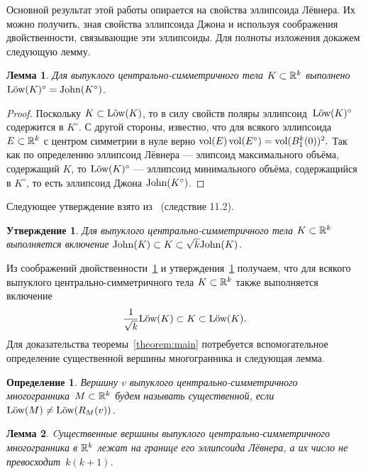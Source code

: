 \documentclass[a4paper,12pt]{article}
\def\vol{\mathop{\rm vol}}
\def\low{\text{\rm L\"ow}}
\def\john{\mathbf{\rm John}}
\newcommand{\lb}[1]{#1\nobreak\discretionary{}{\hbox{\ensuremath{#1}}}{}}
\newtheorem{lem}{Лемма}[section]
\newtheorem{prop}{Утверждение}[section]
\newtheorem*{defin*}{Определение}
\numberwithin{equation}{section}
\begin{document}
	Основной результат этой работы опирается на свойства эллипсоида Лёвнера. Их можно получить, зная свойства эллипсоида Джона и используя соображения двойственности, связывающие эти эллипсоиды. Для полноты изложения докажем следующую лемму.
	\begin{lem}\label{lem:duality}
		Для выпуклого центрально-симметричного тела $K\subset\mathbb {R}^k$ выполнено $\low(K)^{\circ}\lb=\john(K^{\circ})$.
	\end{lem}
	\begin{proof}
		Поскольку $K\subset\low(K)$, то в силу свойств поляры эллипсоид~$\low(K)^{\circ}$ содержится в $K^{\circ}$. С другой стороны, известно, что для всякого эллипсоида~$E\subset\mathbb {R}^k$ с центром симметрии в нуле верно $\vol(E)\vol(E^{\circ})=\vol(B^k_1(0))^2.$ Так как по определению эллипсоид Лёвнера --- элипсоид максимального объёма, содержащий $K$, то $\low(K)^{\circ}$ --- эллипсоид минимального объёма, содержащийся в $K^{\circ}$, то есть эллипсоид Джона $\john(K^{\circ})$.
	\end{proof}
	Следующее утверждение взято из~\cite{gruber} (следствие 11.2).
	\begin{prop}\label{prop:banachmazur}
		Для выпуклого центрально-симметричного тела $K\subset\mathbb {R}^k$ выполняется включение $\john(K)\subset K\subset \sqrt{k}\john(K)$.
	\end{prop}
	Из соображений двойственности~\ref{lem:duality} и утверждения~\ref{prop:banachmazur} получаем, что для всякого выпуклого центрально-симметричного тела $K\subset\mathbb {R}^k$ также выполняется включение
		\begin{equation}
			\frac{1}{\sqrt{k}}\low (K)\subset K\subset\low (K).
		\end{equation}
	Для доказательства теоремы~\ref{theorem:main} потребуется вспомогательное определение существенной вершины многогранника и следующая лемма. 
	\begin{defin*}
		Вершину $v$ выпуклого центрально-симметричного многогранника~$M\subset\mathbb {R}^k$ будем называть существенной, если $\low(M)\neq\low(R_M(v))$.
	\end{defin*}
	\begin{lem}\label{lem:essentials}
		Cущественные вершины выпуклого центрально-симметричного многогранника в $\mathbb {R}^k$ лежат на границе его эллипсоида Лёвнера, а их число не превосходит~$k(k+1)$.
	\end{lem}
\end{document}
